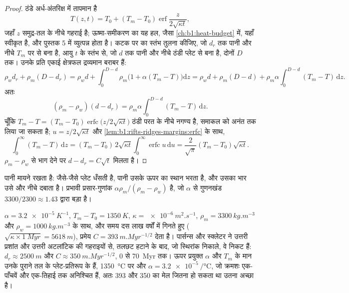 \begin{proof}
ठंडे अर्ध-अंतरिक्ष में तापमान है
\[
  T(z, t) = T_0 + (T_m - T_0)\operatorname{erf}\frac{z}{2\sqrt{\kappa t}},
\]
जहाँ $z$ समुद्र-तल के नीचे गहराई है; ऊष्मा-समीकरण का यह हल, जैसा \cref{ch:b1:heat-budget} में, यहाँ स्वीकृत है, और पुस्तक 5 में व्युत्पन्न होता है। कटक पर का स्तंभ तुलना कीजिए, जो $d_r$ तक पानी और नीचे $T_m$ पर  से बना है, आयु $t$ के स्तंभ से, जो $d$ तक पानी और नीचे ठंडी प्लेट से बना है, दोनों  $D$ तक। उनके प्रति एकाई क्षेत्रफल द्रव्यमान बराबर हैं:
\[
  \rho_w d_r + \rho_m (D - d_r) = \rho_w d + \int_0^{D-d}\rho_m\bigl(1 + \alpha(T_m - T)\bigr)\mathrm dz
  = \rho_w d + \rho_m (D - d) + \rho_m\alpha\int_0^{D-d}(T_m - T)\,\mathrm dz.
\]
अतः
\[
  (\rho_m - \rho_w)(d - d_r) = \rho_m\alpha\int_0^{D-d}(T_m - T)\,\mathrm dz.
\]
चूँकि $T_m - T = (T_m - T_0)\operatorname{erfc}\bigl(z/2\sqrt{\kappa t}\bigr)$ ठंडी परत के नीचे नगण्य है, समाकल को अनंत तक लिया जा सकता है; $u = z/2\sqrt{\kappa t}$ और \cref{lem:b1:rifts-ridges-margins:erfc} के साथ,
\[
  \int_0^\infty (T_m - T)\,\mathrm dz = (T_m - T_0)\,2\sqrt{\kappa t}\int_0^\infty\operatorname{erfc}u\,\mathrm du
  = \frac{2}{\sqrt\pi}(T_m - T_0)\sqrt{\kappa t}.
\]
$\rho_m - \rho_w$ से भाग देने पर $d - d_r = C\sqrt t$ मिलता है।
\end{proof}

पानी मायने रखता है: जैसे-जैसे प्लेट धँसती है, पानी उसके ऊपर का स्थान भरता है, और उसका भार उसे और नीचे दबाता है। प्रभावी प्रसार-गुणांक $\alpha\rho_m/(\rho_m - \rho_w)$ है, जो $\alpha$ से गुणनखंड $3300/2300 \approx 1.43$ द्वारा बड़ा है।

$\alpha = \qty{3.2e-5}{K^{-1}}$, $T_m - T_0 = \qty{1350}{K}$,
$\kappa = \qty{e-6}{m^2.s^{-1}}$, $\rho_m = \qty{3300}{kg.m^{-3}}$ और
$\rho_w = \qty{1000}{kg.m^{-3}}$ के साथ, और समय दस लाख वर्षों में गिनते हुए ($\sqrt{\kappa\times\qty{1}{Myr}} = \qty{5618}{m}$), प्रमेय $C = \qty{393}{m.Myr^{-1/2}}$ देता है। पार्सन्स और स्क्लेटर ने उत्तरी प्रशांत और उत्तरी अटलांटिक की गहराइयों से, तलछट हटाने के बाद, जो स्थिरांक निकाले, वे निकट हैं: $d_r \approx \qty{2500}{m}$ और $C \approx \qty{350}{m.Myr^{-1/2}}$, 0 से \qty{70}{Myr} तक। ऊपर प्रयुक्त $\alpha$ और $T_m$ के मान उनके पुराने तल के प्लेट-प्रतिरूप के हैं, \qty{1350}{\degreeCelsius} पर  और $\alpha = \qty{3.2e-5}{\per\degreeCelsius}$, जो क्रमशः एक-पाँचवें और एक-तिहाई तक अनिश्चित हैं, अतः 393 और 350 का मेल जितना हो सकता था उतना अच्छा है।

